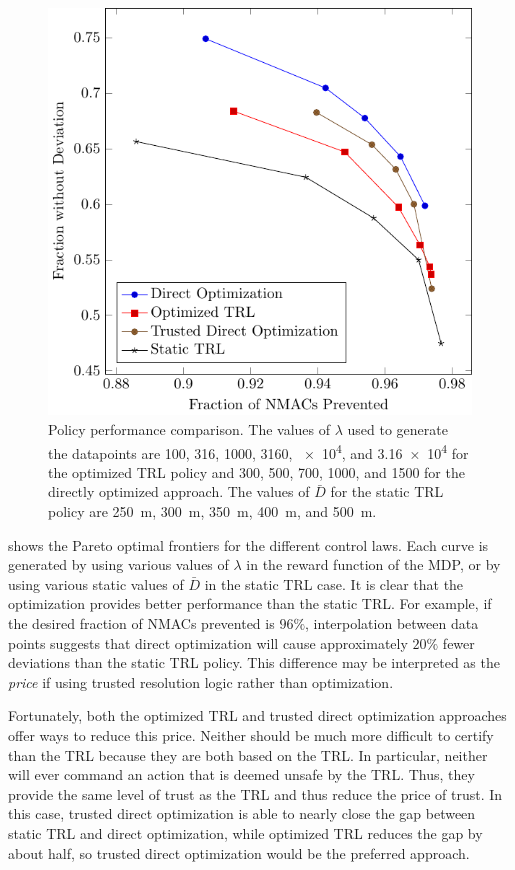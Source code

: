 \begin{figure}[tbp]
    \centering
    \includegraphics[width=0.7\columnwidth]{media/pareto.pdf}
    \caption[Policy performance comparison]{Policy performance comparison. The values of $\lambda$ used to generate the datapoints are \num{100}, \num{316}, \num{1000}, \num{3160}, \num{e4}, and \num{3.16e4} for the optimized TRL policy and \num{300}, \num{500}, \num{700}, \num{1000}, and \num{1500} for the directly optimized approach. The values of $\bar{D}$ for the static TRL policy are \SI{250}{m}, \SI{300}{m}, \SI{350}{m}, \SI{400}{m}, and \SI{500}{m}.}
       \label{fig:pareto}
\end{figure}

 shows the Pareto optimal frontiers for the different control laws. Each curve is generated by using various values of $\lambda$ in the reward function of the MDP, or by using various static values of $\bar{D}$ in the static TRL case. It is clear that the optimization provides better performance than the static TRL. For example, if the desired fraction of NMACs prevented is $96\%$, interpolation between data points suggests that direct optimization will cause approximately $20\%$ fewer deviations than the static TRL policy. This difference may be interpreted as the \emph{price} if using trusted resolution logic rather than optimization.

Fortunately, both the optimized TRL and trusted direct optimization approaches offer ways to reduce this price.
Neither should be much more difficult to certify than the TRL because they are both based on the TRL.
In particular, neither will ever command an action that is deemed unsafe by the TRL. 
Thus, they provide the same level of trust as the TRL and thus reduce the price of trust.
In this case, trusted direct optimization is able to nearly close the gap between static TRL and direct optimization, while optimized TRL reduces the gap by about half, so trusted direct optimization would be the preferred approach.

